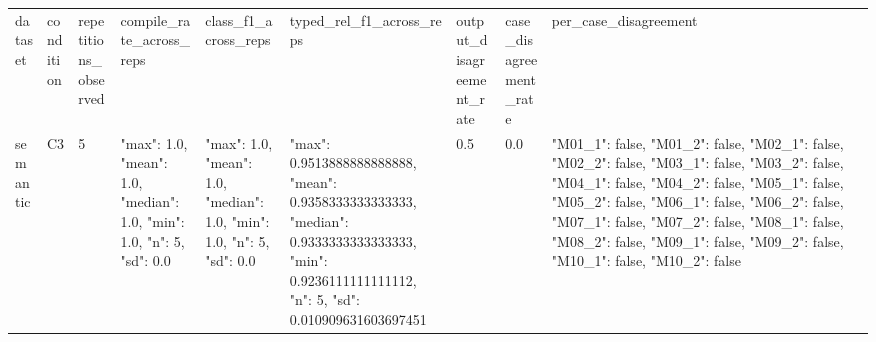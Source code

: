 \begin{tabular}{lllllllll}
dataset & condition & repetitions\_observed & compile\_rate\_across\_reps & class\_f1\_across\_reps & typed\_rel\_f1\_across\_reps & output\_disagreement\_rate & case\_disagreement\_rate & per\_case\_disagreement \\
semantic & C3 & 5 & {"max": 1.0, "mean": 1.0, "median": 1.0, "min": 1.0, "n": 5, "sd": 0.0} & {"max": 1.0, "mean": 1.0, "median": 1.0, "min": 1.0, "n": 5, "sd": 0.0} & {"max": 0.9513888888888888, "mean": 0.9358333333333333, "median": 0.9333333333333333, "min": 0.9236111111111112, "n": 5, "sd": 0.010909631603697451} & 0.5 & 0.0 & {"M01\_1": false, "M01\_2": false, "M02\_1": false, "M02\_2": false, "M03\_1": false, "M03\_2": false, "M04\_1": false, "M04\_2": false, "M05\_1": false, "M05\_2": false, "M06\_1": false, "M06\_2": false, "M07\_1": false, "M07\_2": false, "M08\_1": false, "M08\_2": false, "M09\_1": false, "M09\_2": false, "M10\_1": false, "M10\_2": false} \\
\end{tabular}